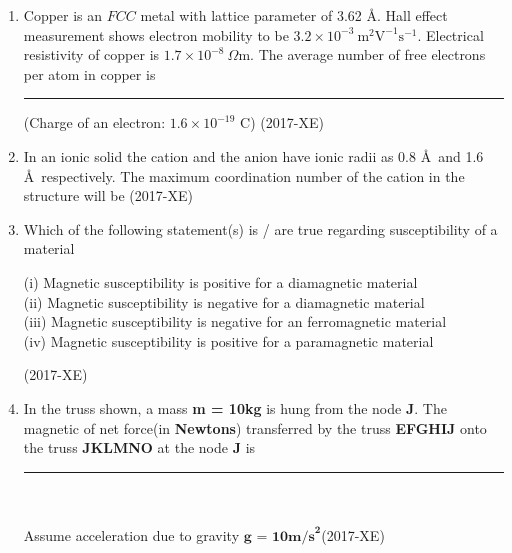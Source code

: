 \documentclass[journal]{IEEEtran}
\begin{document}
\begin{enumerate}
    \item Copper is an $FCC$ metal with lattice parameter of 3.62 \AA . Hall effect measurement shows electron mobility to be $3.2 \times 10^{-3} \ \text{m}^2 \text{V}^{-1}\text{s}^{-1}$. Electrical resistivity of copper is $1.7 \times 10^{-8} \ \Omega \text{m}$. The average number of free electrons per atom in copper is \rule{2.5cm}{0.5pt}(Charge of an electron: $1.6 \times 10^{-19}$ C) \hfill(2017-XE)
    \item In an ionic solid the cation and the anion have ionic radii as 0.8 \AA \ and 1.6 \AA \ respectively. The maximum coordination number of the cation in the structure will be \hfill(2017-XE)
 \begin{enumerate}
 \end{enumerate}
\item Which of the following statement(s) is / are true regarding susceptibility of a material
\begin{center}
    (i) Magnetic susceptibility is positive for a diamagnetic material \\
    (ii) Magnetic susceptibility is negative for a diamagnetic material \\
    (iii) Magnetic susceptibility is negative for an ferromagnetic material \\
    (iv) Magnetic susceptibility is positive for a paramagnetic material
\end{center} 
\hfill(2017-XE)
\begin{enumerate}
\end{enumerate}
\item In the truss shown, a mass \textbf{m = 10kg} is hung from the node \textbf{J}. The magnetic of net force(in \textbf{Newtons}) transferred by the truss \textbf{EFGHIJ} onto the truss \textbf{JKLMNO} at the node \textbf{J} is \rule{2.5cm}{0.6pt} \\\\ Assume acceleration due to gravity $\textbf{g = 10m/s}^\textbf{2}$\hfill(2017-XE)

\end{enumerate}
\end{document}
